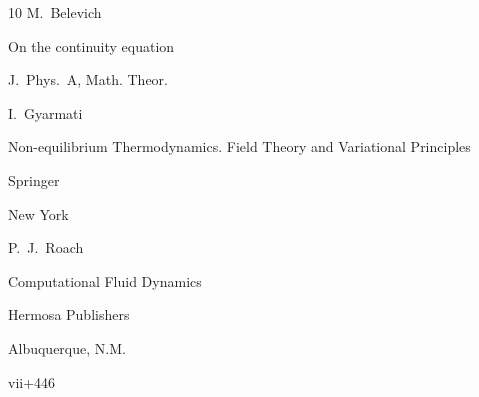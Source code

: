 \begin{thebibliography}{10}
\by M.~Belevich 

\paper On the continuity equation

\jour   J.~Phys.~A, Math. Theor.









\by I.~Gyarmati 

\book  Non-equilibrium Thermodynamics. Field Theory and Variational Principles 

\publ Springer 

\publaddr New York 





\by P.~J.~Roach

\book  Computational Fluid Dynamics 

\publ Hermosa Publishers 

\publaddr Albuquerque, N.M. 


\totalpages vii+446



\end{thebibliography}





\noindent

\hskip6.5cm \thedate \par\noindent

\hskip6.5cm\therevdate

%













\makeengtitlem







\newpage

%


%

%

